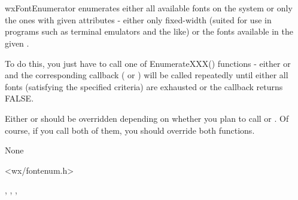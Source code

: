 
\section{}\label{wxfontenumerator}

wxFontEnumerator enumerates either all available fonts on the system or only
the ones with given attributes - either only fixed-width (suited for use in
programs such as terminal emulators and the like) or the fonts available in
the given .

To do this, you just have to call one of EnumerateXXX() functions - either 
 or 
 and the
corresponding callback ( 
 or
) will be called
repeatedly until either all fonts (satisfying the specified criteria) are
exhausted or the callback returns FALSE.


Either  or 
 should be overridden
depending on whether you plan to call 
 or 
. Of course,
if you call both of them, you should override both functions.


None


<wx/fontenum.h>


, 
, 
, 


